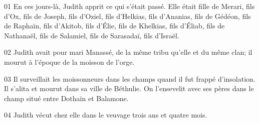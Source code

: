 01 En ces jours-là, Judith apprit ce qui s'était passé. Elle était fille de Merari, fils d'Ox, fils de Joseph, fils d'Oziel, fils d'Helkias, fils d'Ananias, fils de Gédéon, fils de Raphaïn, fils d'Akitob, fils d'Élie, fils de Khelkias, fils d'Éliab, fils de Nathanaël, fils de Salamiel, fils de Sarasadaï, fils d'Israël.

02 Judith avait pour mari Manassé, de la même tribu qu'elle et du même clan; il mourut à l'époque de la moisson de l'orge.

03 Il surveillait les moissonneurs dans les champs quand il fut frappé d'insolation. Il s'alita et mourut dans sa ville de Béthulie. On l'ensevelit avec ses pères dans le champ situé entre Dothaïn et Balamone.

04 Judith vécut chez elle dans le veuvage trois ans et quatre mois.
